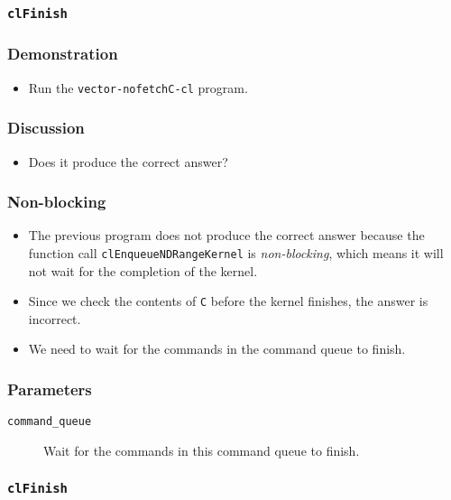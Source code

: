 \documentclass{beamer}
\begin{document}
\begin{frame}
  \frametitle{\tt clFinish}
\end{frame}


\begin{frame}
  \frametitle{Demonstration}
  \begin{itemize}
    \item Run the {\tt vector-nofetchC-cl} program.

  \end{itemize}
\end{frame}

\begin{frame}
  \frametitle{Discussion}
  \begin{itemize}
  \item Does it produce the correct answer?
  \end{itemize}
\end{frame}

\begin{frame}
  \frametitle{Non-blocking}
  \begin{itemize}
    \item The previous program does not produce the correct answer
      because the function call {\tt clEnqueueNDRangeKernel} is {\em
        non-blocking}, which means it will not wait for the completion
      of the kernel.
    \item Since we check the contents of {\tt C} before the kernel
      finishes, the answer is incorrect.
    \item We need to wait for the commands in the command queue to
      finish.
  \end{itemize}
\end{frame}

\begin{frame}
\end{frame}

\begin{frame}
  \frametitle{Parameters}
  \begin{description}
  \item [\tt command\_queue] Wait for the commands in this command
    queue to finish.
  \end{description}
\end{frame}

\begin{frame}
  \frametitle{\tt clFinish}
\end{frame}
\end{document}
